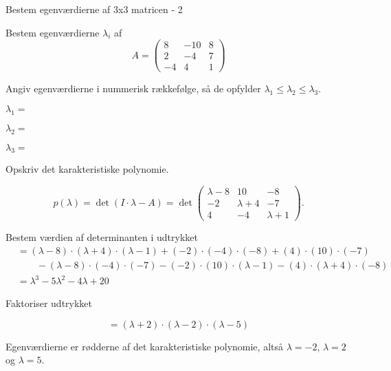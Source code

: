 \documentclass{article}
\begin{document}
\begin{exercise}{Bestem egenværdierne af 3x3 matricen - 2}

Bestem egenværdierne $\lambda_i$ af 
\[
A=\begin{pmatrix}
8 & -10 & 8 \\
2 & -4 & 7 \\
-4 & 4 & 1
\end{pmatrix}
\]

Angiv egenværdierne i nummerisk rækkefølge, så de
opfylder $\lambda_1 \le \lambda_2 \le \lambda_3$.

$\lambda_1 = $ 

$\lambda_2 = $ 

$\lambda_3 = $ 

\hint
Opskriv det karakteristiske polynomie.

\hint
\[
p(\lambda)=\det\left(I \cdot \lambda - A \right)=\det\begin{pmatrix}
\lambda - 8 & 10 & -8 \\
-2 & \lambda + 4 & -7 \\
4 & -4 & \lambda + 1 
\end{pmatrix}.
\]

\hint
Bestem værdien af determinanten i udtrykket
\begin{align*}
&=(\lambda -8) \cdot (\lambda +4) \cdot (\lambda -1)+(-2) \cdot (-4) \cdot (-8)+(4) \cdot (10) \cdot (-7) \\
& \qquad -(\lambda -8) \cdot (-4) \cdot (-7)-(-2) \cdot (10) \cdot (\lambda -1)-(4) \cdot (\lambda +4) \cdot (-8) \\
& = \lambda ^3-5\lambda ^2-4\lambda +20
\end{align*}

\hint
Faktoriser udtrykket

\hint
\[
=(\lambda +2) \cdot (\lambda -2) \cdot (\lambda -5)
\]

\hint
Egenværdierne er rødderne af det karakteristiske polynomie, 
altså
$\lambda=-2$, $\lambda=2$ og $\lambda=5$.

\end{exercise}
\end{document}
